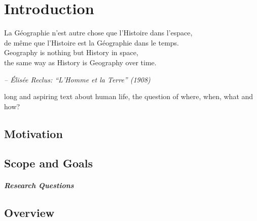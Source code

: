 
\chapter{Introduction} %
\label{cha:introduction}

\begin{quoteit}
\large
La Géographie n’est autre chose que l’Histoire dans l’espace, \\
de même que l’Histoire est la Géographie dans le temps. \\

Geography is nothing but History in space, \\
the same way as History is Geography over time.
\end{quoteit}
\hfill \textit{-- Élisée Reclus: ``L'Homme et la Terre'' (1908)}

long and aspiring text about human life, the question of where, when, what and how?



\section{Motivation} %
\label{sec:motivation}




\section{Scope and Goals} %
\label{sec:goals}





\paragraph{Research Questions} %
\label{par:research_questions}






\section{Overview} %
\label{sec:overview}




